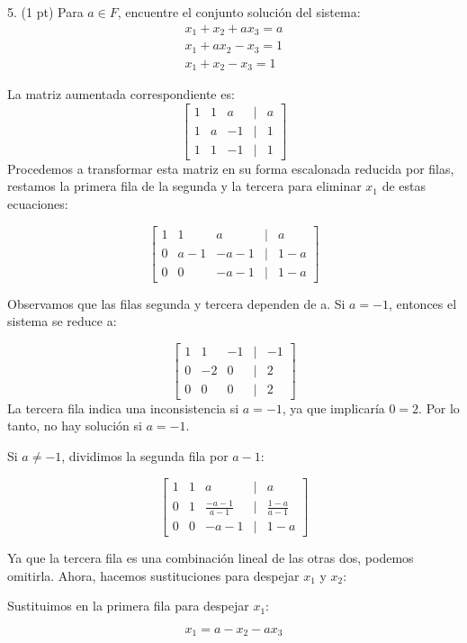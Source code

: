5. (1 pt) Para \( a \in F \), encuentre el conjunto solución del sistema:
\[
\begin{array}{r}
x_{1}+x_{2}+a x_{3}=a \\
x_{1}+a x_{2}-x_{3}=1 \\
x_{1}+x_{2}-x_{3}=1
\end{array}
\]

\begin{solution}

La matriz aumentada correspondiente es:
\[
\begin{bmatrix}
1 & 1 & a & | & a \\
1 & a & -1 & | & 1 \\
1 & 1 & -1 & | & 1
\end{bmatrix}
\]
Procedemos a transformar esta matriz en su forma escalonada reducida por filas, restamos la primera fila de la segunda y la tercera para eliminar $x_1$ de estas ecuaciones:

\[
\begin{bmatrix}
1 & 1 & a & | & a \\
0 & a-1 & -a-1 & | & 1-a \\
0 & 0 & -a-1 & | & 1-a
\end{bmatrix}
\]

Observamos que las filas segunda y tercera dependen de a. Si $a=-1$, entonces el sistema se reduce a:

\[
\begin{bmatrix}
1 & 1 & -1 & | & -1 \\
0 & -2 & 0 & | & 2 \\
0 & 0 & 0 & | & 2
\end{bmatrix}
\]
La tercera fila indica una inconsistencia si $a=-1$, ya que implicaría $0=2$. Por lo tanto, no hay solución si $a=-1$.

Si $a\neq-1$, dividimos la segunda fila por $a-1$:

\[
\begin{bmatrix}
1 & 1 & a & | & a \\
0 & 1 & \frac{-a-1}{a-1} & | & \frac{1-a}{a-1} \\
0 & 0 & -a-1 & | & 1-a
\end{bmatrix}
\]

Ya que la tercera fila es una combinación lineal de las otras dos, podemos omitirla. Ahora, hacemos sustituciones para despejar $x_1$ y $x_2$:


Sustituimos en la primera fila para despejar $x_1$:

\[
x_1 = a - x_2 - a x_3
\]


\end{solution}
